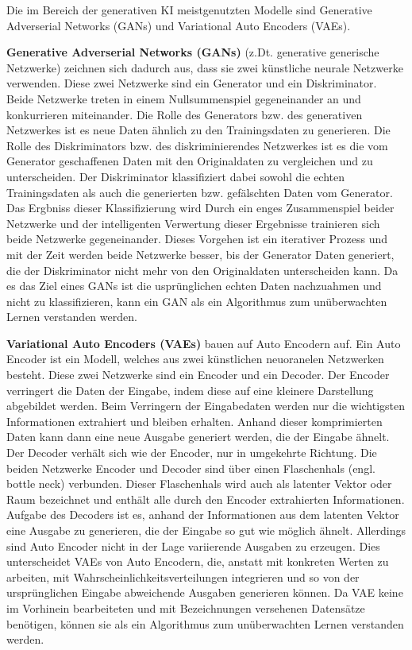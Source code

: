 Die im Bereich der generativen KI meistgenutzten Modelle sind Generative Adverserial Networks (GANs) und Variational Auto Encoders (VAEs).

\textbf{Generative Adverserial Networks (GANs)} (z.Dt. generative generische Netzwerke) zeichnen sich dadurch aus, dass sie zwei künstliche neurale Netzwerke verwenden.
Diese zwei Netzwerke sind ein Generator und ein Diskriminator.
Beide Netzwerke treten in einem Nullsummenspiel gegeneinander an und konkurrieren miteinander.
Die Rolle des Generators bzw. des generativen Netzwerkes ist es neue Daten ähnlich zu den Trainingsdaten zu generieren.
Die Rolle des Diskriminators bzw. des diskriminierendes Netzwerkes ist es die vom Generator geschaffenen Daten mit den Originaldaten zu vergleichen und zu unterscheiden.
Der Diskriminator klassifiziert dabei sowohl die echten Trainingsdaten als auch die generierten bzw. gefälschten Daten vom Generator.
Das Ergbniss dieser Klassifizierung wird 
Durch ein enges Zusammenspiel beider Netzwerke und der intelligenten Verwertung dieser Ergebnisse trainieren sich beide Netzwerke gegeneinander. 
Dieses Vorgehen ist ein iterativer Prozess und mit der Zeit werden beide Netzwerke besser, bis der Generator Daten generiert, die der Diskriminator nicht mehr von den Originaldaten unterscheiden kann.
Da es das Ziel eines GANs ist die usprünglichen echten Daten nachzuahmen und nicht zu klassifizieren, kann ein GAN als ein Algorithmus zum unüberwachten Lernen verstanden werden.

\textbf{Variational Auto Encoders (VAEs)} bauen auf Auto Encodern auf.
Ein Auto Encoder ist ein Modell, welches aus zwei künstlichen neuoranelen Netzwerken besteht.
Diese zwei Netzwerke sind ein Encoder und ein Decoder.
Der Encoder verringert die Daten der Eingabe, indem diese auf eine kleinere Darstellung abgebildet werden.
Beim Verringern der Eingabedaten werden nur die wichtigsten Informationen extrahiert und bleiben erhalten.
Anhand dieser komprimierten Daten kann dann eine neue Ausgabe generiert werden, die der Eingabe ähnelt.
Der Decoder verhält sich wie der Encoder, nur in umgekehrte Richtung.
Die beiden Netzwerke Encoder und Decoder sind über einen Flaschenhals (engl. bottle neck) verbunden.
Dieser Flaschenhals wird auch als latenter Vektor oder Raum bezeichnet und enthält alle durch den Encoder extrahierten Informationen.
Aufgabe des Decoders ist es, anhand der Informationen aus dem latenten Vektor eine Ausgabe zu generieren, die der Eingabe so gut wie möglich ähnelt.
Allerdings sind Auto Encoder nicht in der Lage variierende Ausgaben zu erzeugen.
Dies unterscheidet VAEs von Auto Encodern, die, anstatt mit konkreten Werten zu arbeiten, mit Wahrscheinlichkeitsverteilungen integrieren und so von der ursprünglichen Eingabe abweichende Ausgaben generieren können.
Da VAE keine im Vorhinein bearbeiteten und mit Bezeichnungen versehenen Datensätze benötigen, können sie als ein Algorithmus zum unüberwachten Lernen verstanden werden.

